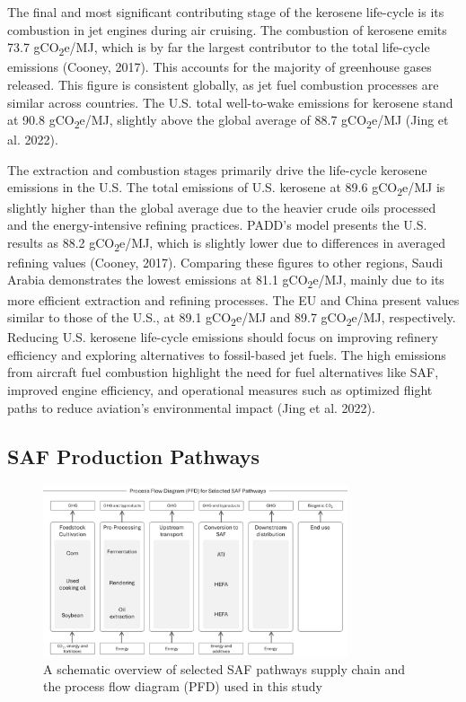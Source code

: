 \documentclass[12pt]{article}
\begin{document}
The final and most significant contributing stage of the kerosene life-cycle is its combustion in jet engines during air cruising. The combustion of kerosene emits 73.7 gCO\textsubscript{2}e/MJ, which is by far the largest contributor to the total life-cycle emissions (Cooney, 2017). This accounts for the majority of greenhouse gases released. This figure is consistent globally, as jet fuel combustion processes are similar across countries. The U.S. total well-to-wake emissions for kerosene stand at 90.8 gCO\textsubscript{2}e/MJ, slightly above the global average of 88.7 gCO\textsubscript{2}e/MJ (Jing et al. 2022).

The extraction and combustion stages primarily drive the life-cycle kerosene emissions in the U.S. The total emissions of U.S. kerosene at 89.6 gCO\textsubscript{2}e/MJ is slightly higher than the global average due to the heavier crude oils processed and the energy-intensive refining practices. PADD’s model presents the U.S. results as 88.2 gCO\textsubscript{2}e/MJ, which is slightly lower due to differences in averaged refining values (Cooney, 2017). Comparing these figures to other regions, Saudi Arabia demonstrates the lowest emissions at 81.1 gCO\textsubscript{2}e/MJ, mainly due to its more efficient extraction and refining processes. The EU and China present values similar to those of the U.S., at 89.1 gCO\textsubscript{2}e/MJ and 89.7 gCO\textsubscript{2}e/MJ, respectively. Reducing U.S. kerosene life-cycle emissions should focus on improving refinery efficiency and exploring alternatives to fossil-based jet fuels. The high emissions from aircraft fuel combustion highlight the need for fuel alternatives like SAF, improved engine efficiency, and operational measures such as optimized flight paths to reduce aviation's environmental impact (Jing et al. 2022).


\subsection{SAF Production Pathways}

\begin{figure}[H]
\centering
\includegraphics[width=0.8\textwidth]{Figures/Fig 2.png} %
\caption{A schematic overview of selected SAF pathways supply chain and the process flow diagram (PFD) used in this study}
\label{fig:figure 2}
\end{figure}
\end{document}
